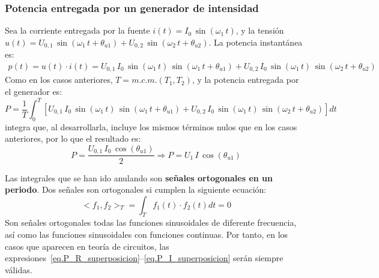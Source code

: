 \documentclass[11pt]{book} %
\begin{document}
\subsubsection{Potencia entregada por un generador de intensidad}

Sea la corriente entregada por la fuente $i(t)=I_0\,\sin(\omega_1\,t)$, y la tensión $u(t)=U_{0,1}\,\sin(\omega_1\,t+\theta_{u1})+U_{0,2}\,\sin(\omega_2\,t+\theta_{u2})$. La potencia instantánea es: 
\begin{align*}
  p(t) = u(t)\cdot i(t) = U_{0,1}\, I_{0}\,\sin(\omega_1\,t)\,\sin(\omega_1\,t+\theta_{u1}) + U_{0,2}\, I_{0}\,\sin(\omega_1\,t)\,\sin(\omega_2\,t+\theta_{u2})
\end{align*} 
Como en los casos anteriores, $T=m.c.m.(T_1,T_2)$, y la potencia entregada por el generador es: 
\begin{equation*}
    P=\dfrac{1}{T}\int_0^T \left[U_{0,1}\, I_{0}\,\sin(\omega_1\,t)\,\sin(\omega_1\,t+\theta_{u1})+U_{0,2}\, I_{0}\,\sin(\omega_1\,t)\,\sin(\omega_2\,t+\theta_{u2}) \right] dt
\end{equation*}
integra que, al desarrollarla, incluye los mismos términos nulos que en los casos anteriores, por lo que el resultado es: 
\begin{equation}\label{eq.P_I_superposicion}
    P=\dfrac{U_{0,1}\,I_0\,\cos(\theta_{u1})}{2}\Rightarrow \boxed{P=U_1\,I\,\cos(\theta_{u1})}
\end{equation}
    
\begin{remark}
    Las integrales que se han ido anulando son \textbf{señales ortogonales en un periodo}. Dos señales son ortogonales si cumplen la siguiente ecuación: 
\begin{equation*}
    <f_1, f_2>_T = \int_T f_1(t) \cdot f_2(t) dt = 0
\end{equation*}
Son señales ortogonales todas las funciones sinusoidales de diferente frecuencia, así como las funciones sinusoidales con funciones continuas. Por tanto, en los casos que aparecen en teoría de circuitos, las expresiones~\eqref{eq.P_R_superposicion}--\eqref{eq.P_I_superposicion} serán siempre válidas. 
\end{remark}
\end{document}
